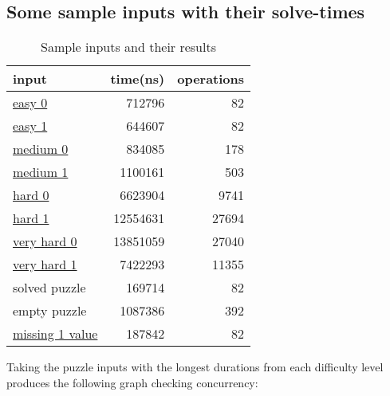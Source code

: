 \documentclass[11pt]{report}
\begin{document}
        \subsection{Some sample inputs with their solve-times}
            \begin{table}[h!]
                \begin{center}
                    \caption{Sample inputs and their results}
                    \begin{tabular}{l|r|r}
                        \textbf{input} & \textbf{time(ns)} & \textbf{operations}\\
                        \hline
                        
                        \hyperref[sec:easy0]{easy 0} & 712796 & 82\\
                        \hyperref[sec:easy1]{easy 1} & 644607 & 82\\

                        \hyperref[sec:mid0]{medium 0} & 834085 & 178\\
                        \hyperref[sec:mid1]{medium 1} & 1100161 & 503\\

                        \hyperref[sec:hard0]{hard 0} & 6623904 & 9741\\
                        \hyperref[sec:hard1]{hard 1} & 12554631 & 27694\\

                        \hyperref[sec:vhard0]{very hard 0} & 13851059 & 27040\\
                        \hyperref[sec:vhard1]{very hard 1} & 7422293 & 11355\\

                        solved puzzle & 169714 & 82\\
                        empty puzzle & 1087386 & 392\\

                        \hyperref[sec:miss]{missing 1 value} & 187842 & 82\\ 

                     
                    \end{tabular}
                \end{center}
            \end{table}
        Taking the puzzle inputs with the longest durations from each difficulty level produces the following graph checking concurrency:\\
\end{document}

